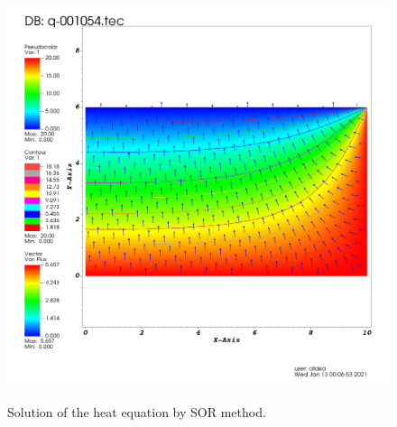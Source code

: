 \documentclass[letterpaper,12pt]{article}
\begin{document}
\begin{figure}[H] 
	\centering 
	\includegraphics[max height=12cm]{graphs/SOR_O19_norad/SOR_O19_norad.png}
	\caption{Solution of the heat equation by SOR method.}
 	\label{fig:sornorad}
\end{figure}
\end{document}
